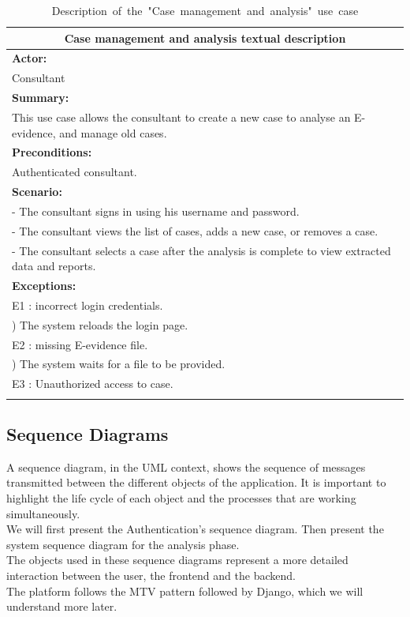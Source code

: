 \newpage
\begin{longtable}{|p{15cm}|}
\hline
\multicolumn{1}{|c|}{\textbf{Case management and analysis textual description}} \\
\hline
\multicolumn{1}{|l|}{\textbf{Actor:} } \\
\quad Consultant\\
\multicolumn{1}{|l|}{\textbf{Summary:} } \\
\quad This use case allows the consultant to create a new case to analyse an E-evidence, and manage old cases.\\
\multicolumn{1}{|l|}{\textbf{Preconditions:} }\\
\quad Authenticated consultant.\\
\multicolumn{1}{|l|}{\textbf{Scenario:}} \\
\quad - The consultant signs in using his username and password. \\
\quad - The consultant views the list of cases, adds a new case, or removes a case. \\
\quad - The consultant selects a case after the analysis is complete to view extracted data and reports. \\
\multicolumn{1}{|l|}{\textbf{Exceptions:}} \\
\quad E1 : incorrect login credentials.\\
\quad 1) The system reloads the login page.\\
\quad E2 : missing E-evidence file.\\
\quad 2) The system waits for a file to be provided.\\
\quad E3 : Unauthorized access to case.\\
\hline
\caption{\mbox{Description of the "Case management and analysis" use case}}
\end{longtable}

\subsection{Sequence Diagrams}
A sequence diagram, in the UML context, shows the sequence of messages transmitted between the different objects of the application. It is important to highlight the life cycle of each object and the processes that are working simultaneously.\\
We will first present the Authentication's sequence diagram. Then present the system sequence diagram for the analysis phase.\\
The objects used in these sequence diagrams represent a more detailed interaction between the user, the frontend and the backend.\\
The platform follows the MTV pattern followed by Django, which we will understand more later.


